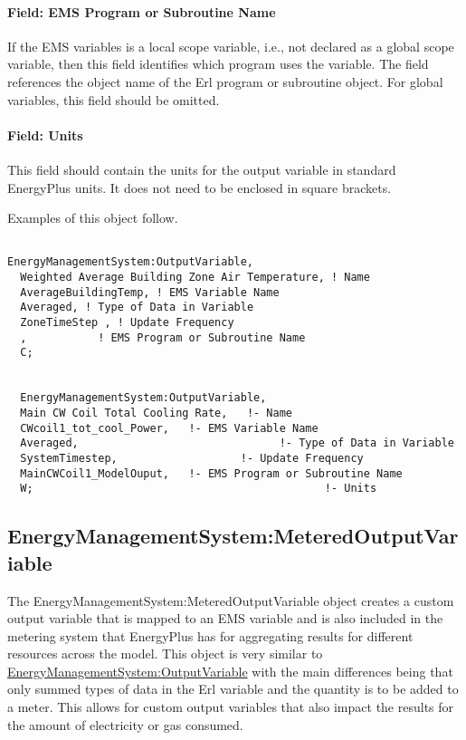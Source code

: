 \paragraph{Field: EMS Program or Subroutine Name}\label{field-ems-program-or-subroutine-name}

If the EMS variables is a local scope variable, i.e., not declared as a global scope variable, then this field identifies which program uses the variable. The field references the object name of the Erl program or subroutine object. For global variables, this field should be omitted.

\paragraph{Field: Units}\label{field-units}

This field should contain the units for the output variable in standard EnergyPlus units. It does not need to be enclosed in square brackets.

Examples of this object follow.

\begin{lstlisting}

EnergyManagementSystem:OutputVariable,
  Weighted Average Building Zone Air Temperature, ! Name
  AverageBuildingTemp, ! EMS Variable Name
  Averaged, ! Type of Data in Variable
  ZoneTimeStep , ! Update Frequency
  ,           ! EMS Program or Subroutine Name
  C;


  EnergyManagementSystem:OutputVariable,
  Main CW Coil Total Cooling Rate,   !- Name
  CWcoil1_tot_cool_Power,   !- EMS Variable Name
  Averaged,                               !- Type of Data in Variable
  SystemTimestep,                   !- Update Frequency
  MainCWCoil1_ModelOuput,   !- EMS Program or Subroutine Name
  W;                                             !- Units
\end{lstlisting}

\subsection{EnergyManagementSystem:MeteredOutputVariable}\label{energymanagementsystemmeteredoutputvariable}

The EnergyManagementSystem:MeteredOutputVariable object creates a custom output variable that is mapped to an EMS variable and is also included in the metering system that EnergyPlus has for aggregating results for different resources across the model. This object is very similar to \hyperref[energymanagementsystemoutputvariable]{EnergyManagementSystem:OutputVariable} with the main differences being that only summed types of data in the Erl variable and the quantity is to be added to a meter. This allows for custom output variables that also impact the results for the amount of electricity or gas consumed.

